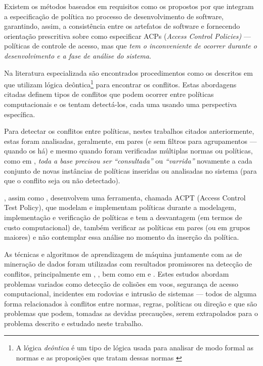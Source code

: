 Existem os métodos baseados em requisitos como os propostos por  que integram a especificação de política no processo de desenvolvimento de software, garantindo, assim, a consistência entre os artefatos de software e fornecendo orientação prescritiva sobre como especificar ACPs (\textit{Access Control Policies)} --- políticas de controle de acesso, mas que\textit{ tem o inconveniente de ocorrer durante o desenvolvimento e a fase de análise do sistema}.

Na literatura especializada são encontrados procedimentos como os descritos em  que utilizam lógica deôntica\footnote{A lógica \textit{deôntica} é um tipo de lógica usada para analisar de modo formal as normas e as proposições que tratam dessas normas \cite{eduardo2017}} para encontrar os conflitos. Estas abordagens citadas definem tipos de conflitos que podem ocorrer entre políticas computacionais e os tentam detectá-los, cada uma usando uma perspectiva específica. 

Para detectar os conflitos entre políticas, nestes trabalhos citados anteriormente, estas foram analisadas, geralmente, em pares (e sem filtros para agrupamentos --- quando os há) e mesmo quando foram verificadas múltiplas normas ou políticas, como em , \textit{toda a base precisou ser} \textit{``consultada''} ou \textit{``varrida''} novamente a cada conjunto de novas instâncias de políticas inseridas ou analisadas no sistema (para que o conflito seja ou não detectado).


, assim como , desenvolvem uma ferramenta, chamada ACPT (Access Control Test Policy), que modelam e implementam políticas durante a modelagem, implementação e verificação de políticas e tem a desvantagem (em termos de custo computacional) de, também verificar as políticas em pares (ou em grupos maiores) e não contemplar essa análise no momento da inserção da política.

As técnicas e algoritmos de aprendizagem de máquina juntamente com as de mineração de dados foram utilizadas com resultados promissores na detecção de conflitos, principalmente em , , bem como em  e . Estes estudos abordam problemas variados como detecção de colisões em voos, segurança de acesso computacional, incidentes em rodovias e intrusão de sistemas — todos de alguma forma relacionados à conflitos entre normas, regras, políticas ou direção e que são problemas que podem, tomadas as devidas precauções, serem extrapolados para o problema descrito e estudado neste trabalho.

